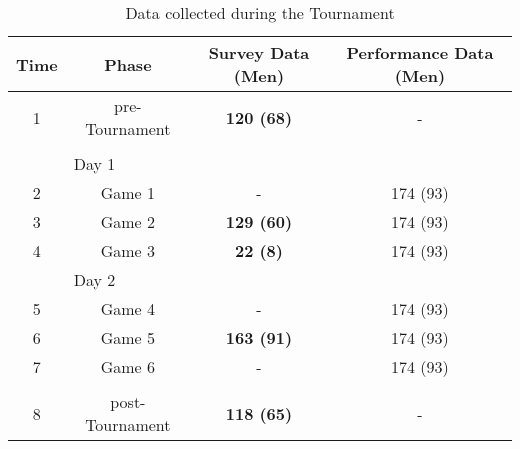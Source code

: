 \documentclass[english]{article}
\begin{document}
      \begin{table}[htbp]\caption{Data collected during the Tournament}
        \begin{center}
          \begin{small}
            \begin{tabular}{c|c c c}
                \bf Time & \bf Phase & \bf Survey Data (Men) & \bf Performance Data (Men) \\
                \hline
                1 & pre-Tournament & \bf 120 (68) & - \\
                & & & \\
                & \multicolumn{1}{l}{Day 1} & & \\
                2 & Game 1 & - & 174 (93) \\
                3 & Game 2 & \bf129 (60) & 174 (93) \\
                4 & Game 3 & \bf22 (8) & 174 (93) \\
                & \multicolumn{1}{l}{Day 2} & & \\
                5 & Game 4 & - & 174 (93) \\
                6 & Game 5 & \bf 163 (91) & 174 (93) \\
                7 & Game 6 & - & 174 (93) \\
                & & & \\
                8 & post-Tournament & \bf118 (65) & - \\
            \end{tabular}
          \end{small}
        \end{center}
        \label{tab:tournamentData}
      \end{table}
\end{document}
